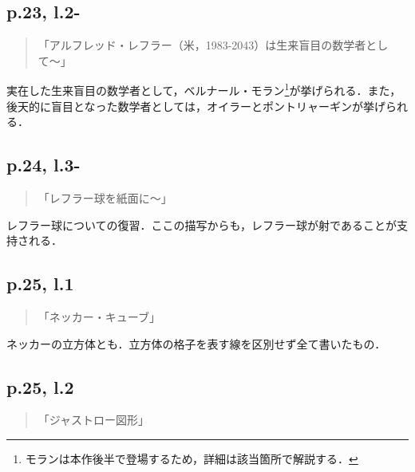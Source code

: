 \documentclass[10pt, a5paper, twoside]{jsarticle}
\theoremstyle{definition}
\begin{document}
            \subsection{p.23, l.2-}

                \begin{quote}

                    「アルフレッド・レフラー（米，1983-2043）は生来盲目の数学者として〜」

                \end{quote}

                実在した生来盲目の数学者として，ベルナール・モラン\footnote{モランは本作後半で登場するため，詳細は該当箇所で解説する．}が挙げられる．また，後天的に盲目となった数学者としては，オイラーとポントリャーギンが挙げられる．

            \subsection{p.24, l.3-}

                \begin{quote}

                    「レフラー球を紙面に〜」

                \end{quote}

                レフラー球についての復習．ここの描写からも，レフラー球が射であることが支持される．


            \subsection{p.25, l.1}

                \begin{quote}

                    「ネッカー・キューブ」

                \end{quote}

                ネッカーの立方体とも．立方体の格子を表す線を区別せず全て書いたもの．

            \subsection{p.25, l.2}

                \begin{quote}

                    「ジャストロー図形」

                \end{quote}
\end{document}
